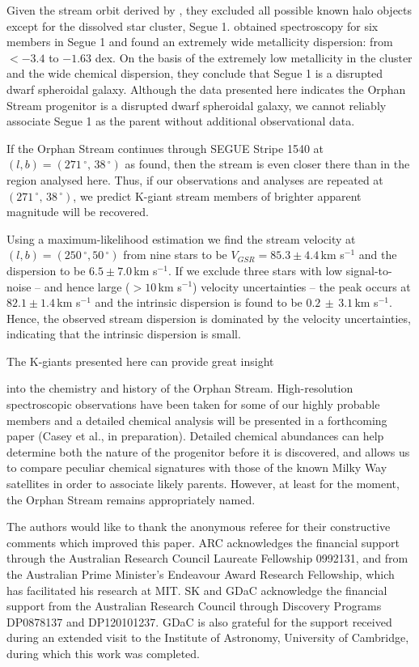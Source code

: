 \documentclass[10pt,apjl]{emulateapj}
\begin{document}
Given the stream orbit derived by \citet{Newberg_et-al_2010}, they excluded all possible known halo objects except for the dissolved star cluster, Segue 1. \citet{Simon_et-al_2011} obtained spectroscopy for six members in Segue 1 and found an extremely wide metallicity dispersion: from $<-3.4$ to $-1.63$ dex. On the basis of the extremely low metallicity in the cluster and the wide chemical dispersion, they conclude that Segue 1 is a disrupted dwarf spheroidal galaxy. Although the data presented here indicates the Orphan Stream progenitor is a disrupted dwarf spheroidal galaxy, we cannot reliably associate Segue 1 as the parent without additional observational data. 

If the Orphan Stream continues through SEGUE Stripe 1540 at $(l, b) = (271\,^\circ,\,38\,^\circ)$ as \citet{Newberg_et-al_2010} found, then the stream is even closer there than in the region analysed here. Thus, if our observations and analyses are repeated at $(271\,^\circ,\,38\,^\circ)$, we predict K-giant stream members of brighter apparent magnitude will be recovered. 

Using a maximum-likelihood estimation we find the stream velocity at $(l, b) = (250\,^\circ, 50\,^\circ)$ from nine stars to be $V_{GSR} = 85.3 \pm 4.4$\,km s$^{-1}$ and the dispersion to be $6.5 \pm 7.0$\,km s$^{-1}$. If we exclude three stars with low signal-to-noise \--- and hence large ($> 10$\,km s$^{-1}$) velocity uncertainties \--- the peak occurs at $82.1 \pm 1.4$\,km s$^{-1}$ and the intrinsic dispersion is found to be $0.2\,\pm\,3.1$\,km s$^{-1}$. Hence, the observed stream dispersion is dominated by the velocity uncertainties, indicating that the intrinsic dispersion is small. 

The K-giants presented here can provide great insight
\begin{minipage}{\columnwidth}
into the chemistry and history of the Orphan Stream. High-resolution spectroscopic observations have been taken for some of our highly probable members and a detailed chemical analysis will be presented in a forthcoming paper (Casey et al., in preparation). Detailed chemical abundances can help determine both the nature of the progenitor before it is discovered, and allows us to compare peculiar chemical signatures with those of the known Milky Way satellites in order to associate likely parents. However, at least for the moment, the Orphan Stream remains appropriately named.
\end{minipage}

\acknowledgements
The authors would like to thank the anonymous referee for their constructive comments which improved this paper. ARC acknowledges the financial support through the Australian Research Council Laureate Fellowship 0992131, and from the Australian Prime Minister's Endeavour Award Research Fellowship, which has facilitated his research at MIT. SK and GDaC acknowledge the financial support from the Australian Research Council through Discovery Programs DP0878137 and DP120101237. GDaC is also grateful for the support received during an extended visit to the Institute of Astronomy, University of Cambridge, during which this work was completed.
\end{document}
